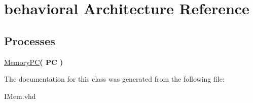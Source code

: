 \hypertarget{classimem_1_1behavioral}{\section{behavioral \-Architecture \-Reference}
\label{classimem_1_1behavioral}
}
\*
\*
\subsection*{\-Processes}
 \begin{DoxyCompactItemize}
\item 
\hypertarget{classimem_1_1behavioral_a8b80c5ce6b239f1f87f4a5ab0892fe79}{\hyperlink{classimem_1_1behavioral_a8b80c5ce6b239f1f87f4a5ab0892fe79}{\-Memory\-P\-C}{\bfseries  ( {\bfseries \-P\-C  } )}}\label{classimem_1_1behavioral_a8b80c5ce6b239f1f87f4a5ab0892fe79}

\end{DoxyCompactItemize}


\-The documentation for this class was generated from the following file\-:\begin{DoxyCompactItemize}
\item 
\-I\-Mem.\-vhd\end{DoxyCompactItemize}
